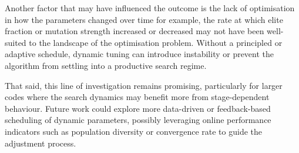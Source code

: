 Another factor that may have influenced the outcome is the lack of optimisation in how the parameters changed over time for example, the rate at which elite fraction or mutation strength increased or decreased may not have been well-suited to the landscape of the optimisation problem. Without a principled or adaptive schedule, dynamic tuning can introduce instability or prevent the algorithm from settling into a productive search regime.

That said, this line of investigation remains promising, particularly for larger codes where the search dynamics may benefit more from stage-dependent behaviour. Future work could explore more data-driven or feedback-based scheduling of dynamic parameters, possibly leveraging online performance indicators such as population diversity or convergence rate to guide the adjustment process. 